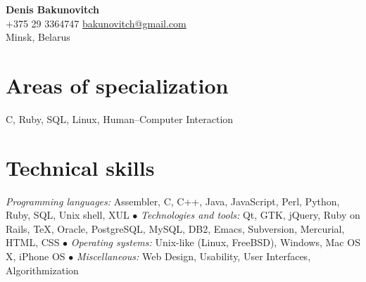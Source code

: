 \documentclass[12pt, a4paper]{article}
\begin{document}
	\newlength{\rcollength}\setlength{\rcollength}{1.85in}%

	\textbf{\Huge Denis Bakunovitch}\\
	+375 29 3364747 \hfill \href{mailto:bakunovitch@gmail.com}{bakunovitch@gmail.com}\\
	Minsk, Belarus\\
	\quad\pagebreak[2]
	\hrulefill

	\section*{Areas of specialization}
	C, Ruby, SQL, Linux, Human--Computer Interaction

	\section*{Technical skills}
	\textit{Programming languages:} Assembler, C, C++, Java, JavaScript, Perl, Python, Ruby, SQL, Unix shell, XUL $\bullet$
	\textit{Technologies and tools:} Qt, GTK, jQuery, Ruby on Rails, \TeX, Oracle, PostgreSQL, MySQL, DB2, Emacs, Subversion, Mercurial, HTML, CSS $\bullet$
	\textit{Operating systems:} Unix-like (Linux, FreeBSD), Windows, Mac OS X, iPhone OS $\bullet$
	\textit{Miscellaneous:} Web Design, Usability, User Interfaces,	Algorithmization
\end{document}
